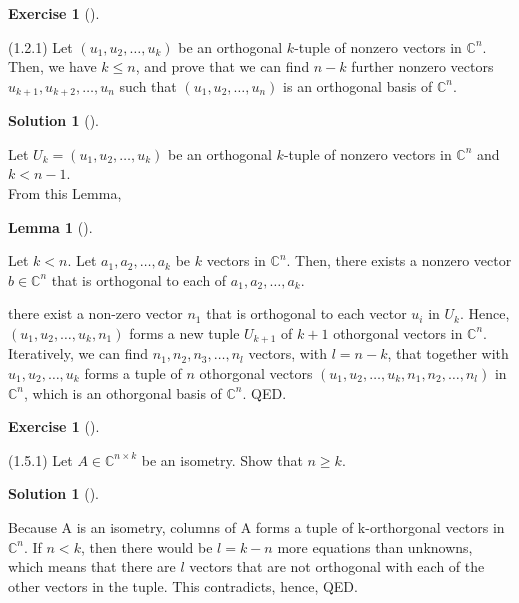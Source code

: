 \documentclass[numbers=enddot,12pt,final,onecolumn,notitlepage]{scrartcl}
\newcounter{exer}
\newcounter{sol}
\theoremstyle{definition}
\newtheorem{lem}[theo]{Lemma}
\newenvironment{lemma}[1][]
{\begin{lem}[#1]\begin{leftbar}}
        {\end{leftbar}\end{lem}}
\newtheorem{exmp}[exer]{Exercise}
\newenvironment{exercise}[1][]
{\begin{exmp}[#1]\begin{leftbar}}
        {\end{leftbar}\end{exmp}}
\newtheorem{solu}[sol]{Solution}
\newenvironment{solution}[1][]
{\begin{solu}[#1]\begin{leftbar}}
        {\end{leftbar}\end{solu}}
\begin{document}
\begin{exercise}
	\label{exe.unitary.orthog-extend} (1.2.1)
	Let $\left(  u_{1},u_{2},\ldots,u_{k}\right)
	$ be an orthogonal $k$-tuple of nonzero vectors in $\mathbb{C}^{n}$. Then, we have $k\leq n$, and prove that we can find $n-k$ further nonzero vectors $u_{k+1}%
		,u_{k+2},\ldots,u_{n}$ such that $\left(  u_{1},u_{2},\ldots,u_{n}\right)  $
	is an orthogonal basis of $\mathbb{C}^{n}$.
\end{exercise}

\begin{solution}
	Let $U_k = \left(u_{1},u_{2},\ldots,u_{k}\right)$ be an orthogonal $k$-tuple of nonzero vectors in $\mathbb{C}^{n}$ and $k < n - 1$. \\

	From this Lemma,

	\begin{lemma}
		\label{lem.unitary.orthog.one-more}Let $k<n$. Let $a_{1},a_{2},\ldots,a_{k}$
		be $k$ vectors in $\mathbb{C}^{n}$. Then, there exists a nonzero vector
		$b\in\mathbb{C}^{n}$ that is orthogonal to each of $a_{1},a_{2},\ldots,a_{k}$.
	\end{lemma}

	there exist a non-zero vector $n_{1}$ that is orthogonal to each vector $u_i$ in $U_k$. Hence, $\left(u_{1},u_{2},\ldots,u_{k},n_{1}\right)$ forms a new tuple $U_{k+1}$ of $k + 1$ othorgonal vectors in $\mathbb{C}^{n}$. Iteratively, we can find $n_1, n_2, n_3,\ldots,n_l$ vectors, with $l = n - k$, that together with $u_{1},u_{2},\ldots,u_{k}$ forms a tuple of $n$ othorgonal vectors $\left(u_{1},u_{2},\ldots,u_{k},n_{1},n_{2},\ldots,n_{l}\right)$ in $\mathbb{C}^{n}$, which is an othorgonal basis of $\mathbb{C}^{n}$. QED.

\end{solution}

\begin{exercise}
	\label{exe.unitary.isometry-tall} (1.5.1) Let $A\in\mathbb{C}^{n\times k}$ be
	an isometry. Show that $n\geq k$.
\end{exercise}

\begin{solution}
	Because A is an isometry, columns of A forms a tuple of k-orthorgonal vectors in $\mathbb{C}^{n}$. If $n < k$, then there would be $l = k-n$ more equations than unknowns, which means that there are $l$ vectors that are not orthogonal with each of the other vectors in the tuple. This contradicts, hence, QED.
\end{solution}
\end{document}

